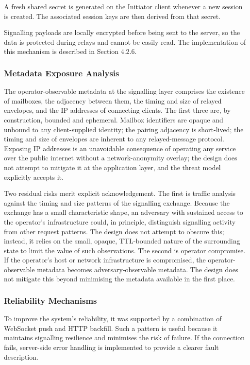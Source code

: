 \documentclass[12pt,a4paper]{article}
\begin{document}
A fresh shared secret is generated on the Initiator client whenever a new session is created. The associated session keys are then derived from that secret.

Signalling payloads are locally encrypted before being sent to the server, so the data is protected during relays and cannot be easily read. The implementation of this mechanism is described in Section 4.2.6.

\subsubsection{Metadata Exposure Analysis}

The operator-observable metadata at the signalling layer comprises the existence of mailboxes, the adjacency between them, the timing and size of relayed envelopes, and the IP addresses of connecting clients. The first three are, by construction, bounded and ephemeral. Mailbox identifiers are opaque and unbound to any client-supplied identity; the pairing adjacency is short-lived; the timing and size of envelopes are inherent to any relayed-message protocol. Exposing IP addresses is an unavoidable consequence of operating any service over the public internet without a network-anonymity overlay; the design does not attempt to mitigate it at the application layer, and the threat model explicitly accepts it.

Two residual risks merit explicit acknowledgement. The first is traffic analysis against the timing and size patterns of the signalling exchange. Because the exchange has a small characteristic shape, an adversary with sustained access to the operator’s infrastructure could, in principle, distinguish signalling activity from other request patterns. The design does not attempt to obscure this; instead, it relies on the small, opaque, TTL-bounded nature of the surrounding state to limit the value of such observations. The second is operator compromise. If the operator’s host or network infrastructure is compromised, the operator-observable metadata becomes adversary-observable metadata. The design does not mitigate this beyond minimising the metadata available in the first place.

\subsubsection{Reliability Mechanisms}

To improve the system’s reliability, it was supported by a combination of WebSocket push and HTTP backfill. Such a pattern is useful because it maintains signalling resilience and minimises the risk of failure. If the connection fails, server-side error handling is implemented to provide a clearer fault description.
\end{document}
